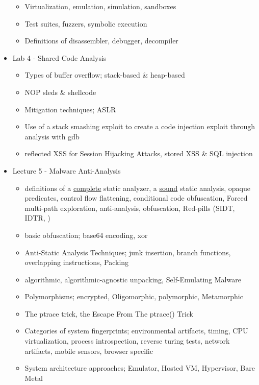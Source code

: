 \documentclass[]{project_plan}
\begin{document}
\begin{itemize}
\begin{itemize}
          \item  Virtualization, emulation, simulation, sandboxes
          \item Test suites, fuzzers, symbolic execution
          \item Definitions of disassembler, debugger, decompiler
        \end{itemize}
  \item Lab 4 - Shared Code Analysis
        \begin{itemize}
          \item Types of buffer overflow; stack-based \& heap-based
          \item NOP sleds \& shellcode
          \item Mitigation techniques; ASLR
          \item Use of a stack smashing exploit to create a code injection exploit through analysis with gdb
          \item reflected XSS for Session Hijacking Attacks, stored XSS \& SQL injection
        \end{itemize}
  \item Lecture 5 - Malware Anti-Analysis
        \begin{itemize}
          \item definitions of a \underline{complete} static analyzer, a \underline{sound} static analysis,
                opaque predicates, control flow flattening, conditional code obfuscation, Forced multi-path exploration,
                anti-analysis, obfuscation, Red-pills (SIDT, IDTR, )
          \item basic obfuscation; base64 encoding, xor
          \item Anti-Static Analysis Techniques; junk insertion, branch functions, overlapping instructions, Packing
          \item algorithmic, algorithmic-agnostic unpacking, Self-Emulating Malware
          \item Polymorphisms; encrypted, Oligomorphic, polymorphic, Metamorphic
          \item The ptrace trick, the Escape From The ptrace() Trick
          \item Categories of system fingerprints; environmental artifacts, timing,
                CPU virtualization, process introspection, reverse turing tests, network
                artifacts, mobile sensors, browser specific
          \item System architecture approaches; Emulator, Hosted VM, Hypervisor, Bare Metal

\end{itemize}
\end{itemize}
\end{document}
